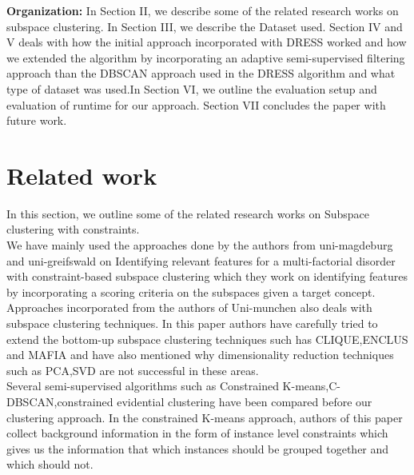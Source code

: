 \documentclass[10pt, conference, compsocconf]{IEEEtran}
\begin{document}


\textbf{Organization:} In Section II, we describe some of the related research works on subspace clustering. In Section III, we describe the Dataset used. Section IV and V deals with how the initial approach incorporated with DRESS worked and how we extended the algorithm by  incorporating an adaptive semi-supervised filtering approach than the DBSCAN approach used in the DRESS algorithm and what type of dataset was used.In Section VI, we outline the evaluation setup and evaluation of runtime for our approach. Section VII concludes the paper with future work.


\section{Related work}
In this section, we outline some of the related research works on Subspace clustering with constraints.\\
We have mainly used the approaches done by the authors from uni-magdeburg and uni-greifswald on Identifying relevant features for a multi-factorial disorder with constraint-based subspace clustering which they work on identifying features by incorporating a scoring criteria on the subspaces given a target concept.\cite{tommy}\\
Approaches incorporated from the authors of Uni-munchen also deals with subspace clustering techniques. In this paper authors have carefully tried to extend the bottom-up subspace clustering techniques such has CLIQUE,ENCLUS and MAFIA and have also mentioned why dimensionality reduction techniques such as PCA,SVD are not successful in these areas.  \cite{mun}\\

Several semi-supervised algorithms such as Constrained K-means,C-DBSCAN,constrained evidential clustering have been compared before our clustering approach.
In the constrained K-means approach, authors of this paper collect background information in the form of instance level constraints which gives us 
the information that which instances should be grouped together and which should not.
\end{document}
